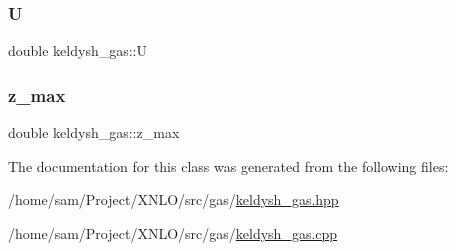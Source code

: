 \subsubsection{\texorpdfstring{U}{U}}
{\footnotesize\ttfamily double keldysh\+\_\+gas\+::U}

\mbox{\label{classkeldysh__gas_a117691dd8b6fd06b34a73392c0e73e32}} 
\subsubsection{\texorpdfstring{z\+\_\+max}{z\_max}}
{\footnotesize\ttfamily double keldysh\+\_\+gas\+::z\+\_\+max}



The documentation for this class was generated from the following files\+:\begin{DoxyCompactItemize}
\item 
/home/sam/\+Project/\+X\+N\+L\+O/src/gas/\hyperlink{keldysh__gas_8hpp}{keldysh\+\_\+gas.\+hpp}\item 
/home/sam/\+Project/\+X\+N\+L\+O/src/gas/\hyperlink{keldysh__gas_8cpp}{keldysh\+\_\+gas.\+cpp}\end{DoxyCompactItemize}
